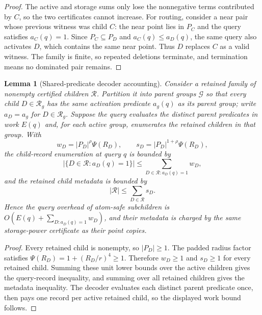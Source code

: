 \documentclass[10pt]{article}
\newtheorem{lemma}[theorem]{Lemma}
\theoremstyle{definition}
\begin{document}
\begin{proof}
   The active and storage sums only lose the nonnegative terms contributed by
   $C$, so the two certificates cannot increase.  For routing, consider a near
   pair whose previous witness was child $C$: the near point lies in $P_C$ and
   the query satisfies $a_C(q)=1$.  Since $P_C\subseteq P_D$ and
   $a_C(q)\le a_D(q)$, the same query also activates $D$, which contains the
   same near point.  Thus $D$ replaces $C$ as a valid witness.  The family is
   finite, so repeated deletions terminate, and termination means no dominated
   pair remains.
\end{proof}

\begin{lemma}[Shared-predicate decoder accounting]
   \label{lem:shared-predicate-decoder}
   Consider a retained family of nonempty certified children
   $\mathcal R$.  Partition it into parent groups $\mathcal G$ so that every
   child $D\in\mathcal R_g$ has the same activation predicate $a_g(q)$ as its
   parent group; write $a_D=a_g$ for $D\in\mathcal R_g$.  Suppose the query
   evaluates the distinct parent predicates in work $E(q)$ and, for each active
   group, enumerates the retained children in that group.  With
   \[
      w_D=|P_D|^\rho\Psi(R_D),
      \qquad
      s_D=|P_D|^{1+\rho}\Psi(R_D),
   \]
   the child-record enumeration at query $q$ is bounded by
   \[
      |\{D\in\mathcal R:a_D(q)=1\}|
      \le
      \sum_{D\in\mathcal R:a_D(q)=1} w_D,
   \]
   and the retained child metadata is bounded by
   \[
      |\mathcal R|\le \sum_{D\in\mathcal R}s_D .
   \]
   Hence the query overhead of atom-safe subchildren is
   $O(E(q)+\sum_{D:a_D(q)=1}w_D)$, and their metadata is charged by the same
   storage-power certificate as their point copies.
\end{lemma}

\begin{proof}
   Every retained child is nonempty, so $|P_D|\ge1$.  The padded radius factor
   satisfies $\Psi(R_D)=1+(R_D/r)^4\ge1$.  Therefore
   $w_D\ge1$ and $s_D\ge1$ for every retained child.  Summing these unit lower
   bounds over the active children gives the query-record inequality, and
   summing over all retained children gives the metadata inequality.  The
   decoder evaluates each distinct parent predicate once, then pays one record
   per active retained child, so the displayed work bound follows.
\end{proof}
\end{document}
